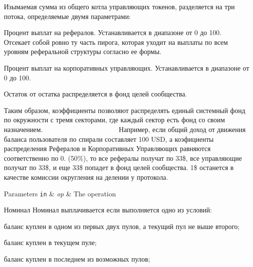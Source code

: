 Изымаемая сумма из общего котла управляющих токенов, разделяется на три потока, определяемые двумя параметрами\+:
\begin{DoxyItemize}
\item Процент выплат на рефералов. Устанавливается в диапазоне от 0 до 100. Отсекает собой ровно ту часть пирога, которая уходит на выплаты по всем уровням реферальной структуры согласно ее формы.
\item Процент выплат на корпоративных управляющих. Устанавливается в диапазоне от 0 до 100.
\item Остаток от остатка распределяется в фонд целей сообщества.
\end{DoxyItemize}

Таким образом, коэффициенты позволяют распределять единый системный фонд по окружности с тремя секторами, где каждый сектор есть фонд со своим назначением. ~\newline
~\newline
~\newline
~\newline
~\newline
~\newline
~\newline
~\newline
~\newline
~\newline
~\newline
~\newline
~\newline
 Например, если общий доход от движения баланса пользователя по спирали составляет 100 U\+SD, а коэфициенты распределения Рефералов и Корпоративных Управляющих равняются соответственно по 0. (50\%), то все рефералы получат по 33\$, все управляющие получат по 33\$, и еще 33\$ попадет в фонд целей сообщества. 1\$ останется в качестве комиссии округления на делении у протокола.


\begin{DoxyParams}[1]{Parameters}
\mbox{\tt in}  & {\em op} & The operation \\
\hline
\end{DoxyParams}
Номинал Номинал выплачивается если выполняется одно из условий\+:
\begin{DoxyItemize}
\item баланс куплен в одном из первых двух пулов, а текущий пул не выше второго;
\item баланс куплен в текущем пуле;
\item баланс куплен в последнем из возможных пулов;
\end{DoxyItemize}

